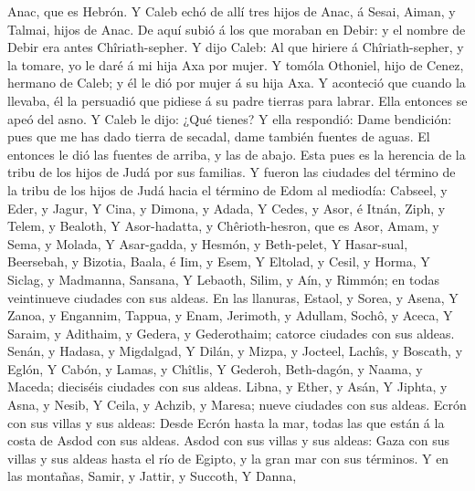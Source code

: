 Anac, que es Hebrón.  Y Caleb echó de allí tres hijos de
Anac, á Sesai, Aiman, y Talmai, hijos de Anac.  De aquí
subió á los que moraban en Debir: y el nombre de Debir era antes
Chîriath-sepher.  Y dijo Caleb: Al que hiriere á
Chîriath-sepher, y la tomare, yo le daré á mi hija Axa por mujer.
 Y tomóla Othoniel, hijo de Cenez, hermano de Caleb; y él
le dió por mujer á su hija Axa.  Y aconteció que cuando
la llevaba, él la persuadió que pidiese á su padre tierras para labrar.
Ella entonces se apeó del asno. Y Caleb le dijo: ¿Qué tienes?
 Y ella respondió: Dame bendición: pues que me has dado
tierra de secadal, dame también fuentes de aguas. El entonces le dió las
fuentes de arriba, y las de abajo.  Esta pues es la
herencia de la tribu de los hijos de Judá por sus familias.
 Y fueron las ciudades del término de la tribu de los
hijos de Judá hacia el término de Edom al mediodía: Cabseel, y Eder, y
Jagur,  Y Cina, y Dimona, y Adada,  Y
Cedes, y Asor, é Itnán,  Ziph, y Telem, y Bealoth,
 Y Asor-hadatta, y Chêrioth-hesron, que es Asor,
 Amam, y Sema, y Molada,  Y Asar-gadda, y
Hesmón, y Beth-pelet,  Y Hasar-sual, Beersebah, y
Bizotia,  Baala, é Iim, y Esem,  Y
Eltolad, y Cesil, y Horma,  Y Siclag, y Madmanna,
Sansana,  Y Lebaoth, Silim, y Aín, y Rimmón; en todas
veintinueve ciudades con sus aldeas.  En las llanuras,
Estaol, y Sorea, y Asena,  Y Zanoa, y Engannim, Tappua, y
Enam,  Jerimoth, y Adullam, Sochô, y Aceca,
 Y Saraim, y Adithaim, y Gedera, y Gederothaim; catorce
ciudades con sus aldeas.  Senán, y Hadasa, y Migdalgad,
 Y Dilán, y Mizpa, y Jocteel,  Lachîs, y
Boscath, y Eglón,  Y Cabón, y Lamas, y Chîtlis,
 Y Gederoh, Beth-dagón, y Naama, y Maceda; dieciséis
ciudades con sus aldeas.  Libna, y Ether, y Asán,
 Y Jiphta, y Asna, y Nesib,  Y Ceila, y
Achzib, y Maresa; nueve ciudades con sus aldeas.  Ecrón
con sus villas y sus aldeas:  Desde Ecrón hasta la mar,
todas las que están á la costa de Asdod con sus aldeas. 
Asdod con sus villas y sus aldeas: Gaza con sus villas y sus aldeas
hasta el río de Egipto, y la gran mar con sus términos. 
Y en las montañas, Samir, y Jattir, y Succoth,  Y Danna,
